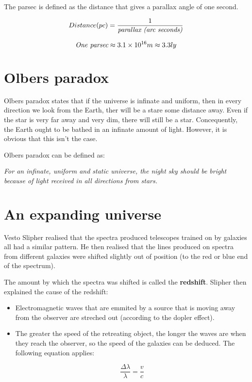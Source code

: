 \documentclass{article}
\begin{document}
The parsec is defined as the distance that gives a parallax angle of one second.

\[
	Distance(pc) = \frac{1}{\textrm{\it parallax (arc seconds)}}
\]

\[
	\textrm{\it One parsec} \approx 3.1\times10^{16}m \approx 3.3ly
\]

\section{Olbers paradox}

Olbers paradox states that if the universe is infinate and uniform, then in
every direction we look from the Earth, ther will be a stare some distance away.
Even if the star is very far away and very dim, there will still be a star.
Concequently, the Earth ought to be bathed in an infinate amount of light.
However, it is obvious that this isn't the case.

Olbers paradox can be defined as:

{\it For an infinate, uniform and static universe, the night sky should be
bright because of light received in all directions from stars.}

\section{An expanding universe}

Vesto Slipher realised that the spectra produced telescopes trained on by
galaxies all had a similar pattern. He then realised that the lines
produced on spectra from different galaxies were shifted slightly out of
position (to the red or blue end of the spectrum).


The amount by which the spectra was shifted is called the {\bf redshift}.
Slipher then explained the cause of the redshift:

\begin{itemize}
	
	\item Electromagnetic waves that are emmited by a source that is moving away
	from the observer are streched out (according to the dopler effect).

	\item The greater the speed of the retreating object, the longer the waves
	are when they reach the observer, so the speed of the galaxies can be
	deduced. The following equation applies:

	\[
		\frac{\Delta \lambda}{\lambda} = \frac{v}{c}
	\]

\end{itemize}
\end{document}
